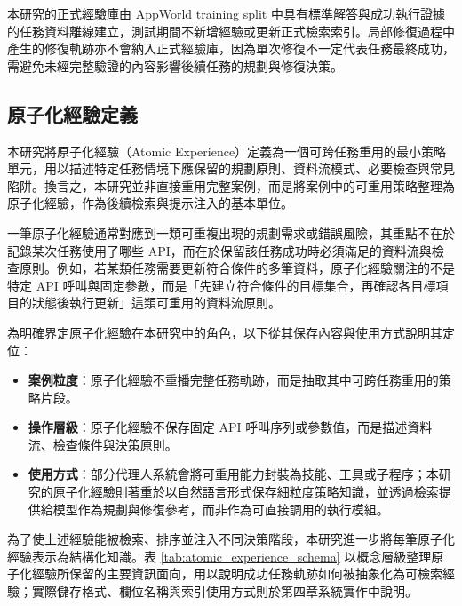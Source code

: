 \begin{ZhChapter}
本研究的正式經驗庫由 AppWorld training split 中具有標準解答與成功執行證據的任務資料離線建立，測試期間不新增經驗或更新正式檢索索引。局部修復過程中產生的修復軌跡亦不會納入正式經驗庫，因為單次修復不一定代表任務最終成功，需避免未經完整驗證的內容影響後續任務的規劃與修復決策。

\subsection{原子化經驗定義}

本研究將原子化經驗（Atomic Experience）定義為一個可跨任務重用的最小策略單元，用以描述特定任務情境下應保留的規劃原則、資料流模式、必要檢查與常見陷阱。換言之，本研究並非直接重用完整案例，而是將案例中的可重用策略整理為原子化經驗，作為後續檢索與提示注入的基本單位。

一筆原子化經驗通常對應到一類可重複出現的規劃需求或錯誤風險，其重點不在於記錄某次任務使用了哪些 API，而在於保留該任務成功時必須滿足的資料流與檢查原則。例如，若某類任務需要更新符合條件的多筆資料，原子化經驗關注的不是特定 API 呼叫與固定參數，而是「先建立符合條件的目標集合，再確認各目標項目的狀態後執行更新」這類可重用的資料流原則。

為明確界定原子化經驗在本研究中的角色，以下從其保存內容與使用方式說明其定位：

\begin{itemize}
    \item \textbf{案例粒度}：原子化經驗不重播完整任務軌跡，而是抽取其中可跨任務重用的策略片段。
    \item \textbf{操作層級}：原子化經驗不保存固定 API 呼叫序列或參數值，而是描述資料流、檢查條件與決策原則。
    \item \textbf{使用方式}：部分代理人系統會將可重用能力封裝為技能、工具或子程序；本研究的原子化經驗則著重於以自然語言形式保存細粒度策略知識，並透過檢索提供給模型作為規劃與修復參考，而非作為可直接調用的執行模組。
\end{itemize}

為了使上述經驗能被檢索、排序並注入不同決策階段，本研究進一步將每筆原子化經驗表示為結構化知識。表 \ref{tab:atomic_experience_schema} 以概念層級整理原子化經驗所保留的主要資訊面向，用以說明成功任務軌跡如何被抽象化為可檢索經驗；實際儲存格式、欄位名稱與索引使用方式則於第四章系統實作中說明。


\end{ZhChapter}
